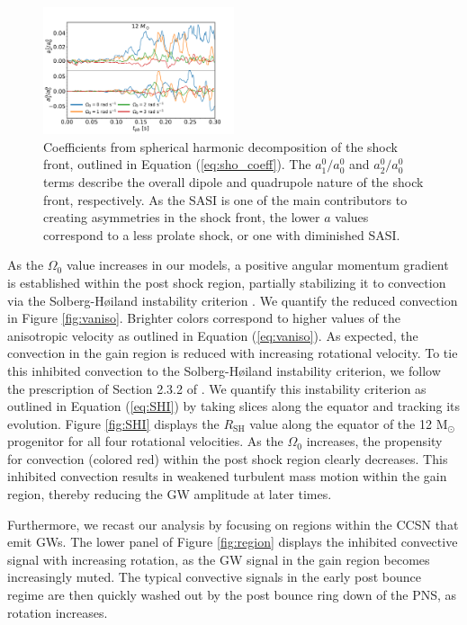 \documentclass[twocolumn,times]{aastex62}  %
\newcommand{\Msun}{\ensuremath{\mathrm{M}_\odot}\xspace}
\begin{document}
\begin{figure}
    \centering
    \includegraphics[width=0.5\textwidth]{sasi_axis_norm.pdf}
    \caption{Coefficients from spherical harmonic decomposition of the shock front, outlined in Equation (\ref{eq:sho_coeff}).  The $a_1^0/a_0^0$ and $a_2^0/a_0^0$ terms describe the overall dipole and quadrupole nature of the shock front, respectively.  As the SASI is one of the main contributors to creating asymmetries in the shock front, the lower $a$ values correspond to a less prolate shock, or one with diminished SASI.}
    \label{fig:sasi}
\end{figure}

  As the $\Omega_0$ value increases in our models, a positive angular momentum gradient is established within the post shock region, partially stabilizing it to convection via the Solberg-H{\o}iland instability criterion \citep{endal:1978,fryer:2000}.  We quantify the reduced convection in Figure \ref{fig:vaniso}.  Brighter colors correspond to higher values of the anisotropic velocity as outlined in Equation (\ref{eq:vaniso}).  As expected, the convection in the gain region is reduced with increasing rotational velocity.  To tie this inhibited convection to the Solberg-H{\o}iland instability criterion, we follow the prescription of Section 2.3.2 of \citet{heger:2000}.  We quantify this instability criterion as outlined in Equation (\ref{eq:SHI}) by taking slices along the equator and tracking its evolution.  Figure \ref{fig:SHI} displays the $R_{\mathrm{SH}}$ value along the equator of the 12 \Msun progenitor for all four rotational velocities.  As the $\Omega_0$ increases, the propensity for convection (colored red) within the post shock region clearly decreases.  This inhibited convection results in weakened turbulent mass motion within the gain region, thereby reducing the GW amplitude at later times.
 
Furthermore, we recast our analysis by focusing on regions within the CCSN that emit GWs.  The lower panel of Figure \ref{fig:region} displays the inhibited convective signal  with increasing rotation, as the GW signal in the gain region becomes increasingly muted.  The typical convective signals in the early post bounce regime are then quickly washed out by the post bounce ring down of the PNS, as rotation increases.
\end{document}
